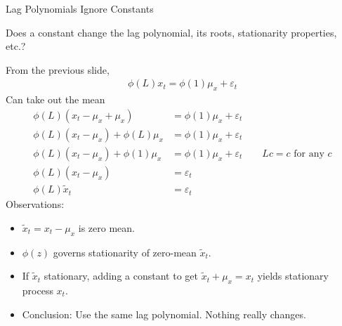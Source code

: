 \documentclass[aspectratio=169, handout]{beamer}
\begin{document}
{\scriptsize
\begin{frame}{Lag Polynomials Ignore Constants}

Does a constant change the lag polynomial, its
roots, stationarity properties, etc.?

From the previous slide,
\begin{align*}
  \phi(L)x_t
  =
  \phi(1)\mu_x + \varepsilon_t
\end{align*}
Can take out the mean
\begin{align*}
  \phi(L)(x_t-\mu_x+\mu_x)
  &=
  \phi(1)\mu_x + \varepsilon_t
  \\
  \phi(L)(x_t-\mu_x)+\phi(L)\mu_x
  &=
  \phi(1)\mu_x + \varepsilon_t
  \\
  \phi(L)(x_t-\mu_x)+\phi(1)\mu_x
  &=
  \phi(1)\mu_x + \varepsilon_t
  \qquad
  \text{$Lc=c$ for any $c$}
  \\
  \phi(L)(x_t-\mu_x)
  &=
  \varepsilon_t
  \\
  \phi(L)\tilde{x}_t
  &=
  \varepsilon_t
\end{align*}
Observations:
\begin{itemize}
  \item $\tilde{x}_t=x_t-\mu_x$ is zero mean.
  \item $\phi(z)$ governs stationarity of zero-mean
    $\tilde{x}_t$.
  \item If $\tilde{x}_t$ stationary, adding a \alert{constant}
    to get $\tilde{x}_t+\mu_x=x_t$ yields stationary process $x_t$.
  \item Conclusion: Use the same lag polynomial.
    Nothing really changes.
\end{itemize}
\end{frame}
}
\end{document}
